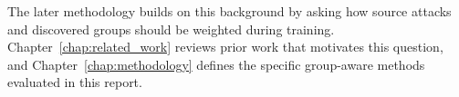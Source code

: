 The later methodology builds on this background by asking how source attacks and discovered groups should be weighted during training. Chapter~\ref{chap:related_work} reviews prior work that motivates this question, and Chapter~\ref{chap:methodology} defines the specific group-aware methods evaluated in this report.
